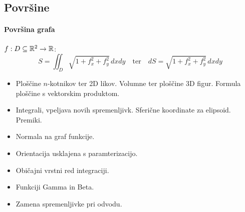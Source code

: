 \subsection{Površine}
\paragraph{Površina grafa} \(f: D \subseteq \mathbb{R}^2 \to \mathbb{R}\):
\[
    S = \iint_D \sqrt{1 + f_x^2 + f_y^2} \, dxdy \quad \text{ter} \quad dS = \sqrt{1 + f_x^2 + f_y^2} \, dxdy
\]



\todo{}
\begin{itemize}
    \item Ploščine \(n\)-kotnikov ter 2D likov. Volumne ter ploščine 3D figur. Formula ploščine s vektorskim produktom.
    \item Integrali, vpeljava novih spremenljivk. Sferične koordinate za elipsoid. Premiki.
    \item Normala na graf funkcije.
    \item Orientacija usklajena s paramterizacijo.
    \item Običajni vrstni red integraciji.
    \item Funkciji Gamma in Beta.
    \item Zamena spremenljivke pri odvodu.
\end{itemize}